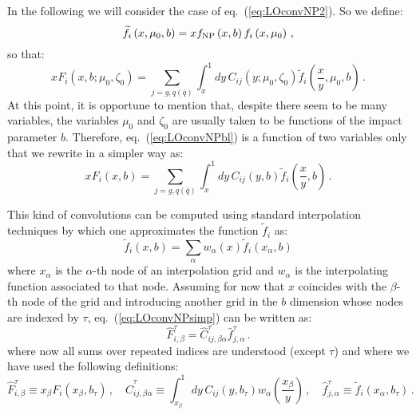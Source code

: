 \documentclass[10pt,a4paper]{article}
\begin{document}
In the following we will consider the case of
eq.~(\ref{eq:LOconvNP2}). So we define:
\begin{equation}
\widetilde{f}_i\left(x,\mu_0,b\right) = xf_{\rm NP}\left(x,b\right) f_i\left(x,\mu_0\right)\,,
\end{equation}
so that:
\begin{equation}\label{eq:LOconvNPbl}
x F_i(x,b;\mu_0,\zeta_0) =
\sum_{j=g,q(\bar{q})}\int_x^1dy\,C_{ij}(y;\mu_0,\zeta_0)  \widetilde{f}_i\left(\frac{x}{y},\mu_0,b\right)\,.
\end{equation}
At this point, it is opportune to mention that, despite there seem to
be many variables, the variables $\mu_0$ and $\zeta_0$ are usually
taken to be functions of the impact parameter $b$. Therefore,
eq.~(\ref{eq:LOconvNPbl}) is a function of two variables only that we
rewrite in a simpler way as:
\begin{equation}\label{eq:LOconvNPsimp}
  x F_i(x,b) =
  \sum_{j=g,q(\bar{q})}\int_x^1dy\,C_{ij}(y,b)  \widetilde{f}_i\left(\frac{x}{y},b\right)\,.
\end{equation}

This kind of convolutions can be computed using standard interpolation
techniques by which one approximates the function $\widetilde{f}_i$ as:
\begin{equation}
  \widetilde{f}_i(x,b) = \sum_\alpha w_\alpha(x) \widetilde{f}_i(x_\alpha,b)
\end{equation}
where $x_\alpha$ is the $\alpha$-th node of an interpolation grid and
$w_\alpha$ is the interpolating function associated to that
node. Assuming for now that $x$ coincides with the $\beta$-th node of
the grid and introducing another grid in the $b$ dimension whose nodes
are indexed by $\tau$, eq.~(\ref{eq:LOconvNPsimp}) can be written as:
\begin{equation}\label{eq:LOconvNPsimp1}
  \hat{F}_{i,\beta}^\tau = \hat{C}_{ij,\beta\alpha}^\tau \hat{f}_{j,\alpha}^\tau\,.
\end{equation}
where now all sums over repeated indices are understood (except
$\tau$) and where we have used the following definitions:
\begin{equation}
\hat{F}_{i,\beta}^\tau\equiv x_\beta F_i(x_\beta,b_\tau)\,,\quad
\hat{C}_{ij,\beta\alpha}^\tau \equiv
\int_{x_\beta}^1dy\,C_{ij}(y,b_\tau)w_\alpha\left(\frac{x_\beta}{y}\right)\,,\quad
  \hat{f}_{j,\alpha}^\tau \equiv \widetilde{f}_i(x_\alpha,b_\tau)\,.
\end{equation}
\end{document}
